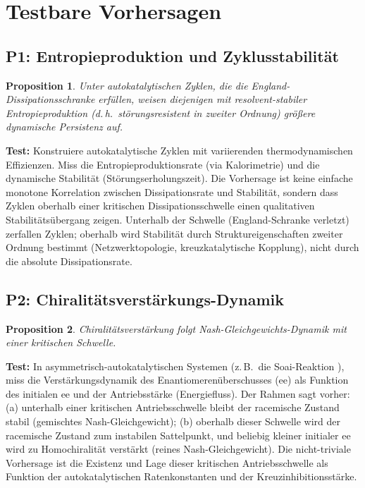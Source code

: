 \documentclass[12pt,a4paper]{article}
\newtheorem{proposition}{Proposition}
\theoremstyle{remark}
\begin{document}
\section{Testbare Vorhersagen}
\label{sec:predictions}

\subsection{P1: Entropieproduktion und Zyklusstabilit\"at}

\begin{proposition}
Unter autokatalytischen Zyklen, die die England-Dissipationsschranke erf\"ullen, weisen diejenigen mit resolvent-stabiler Entropieproduktion (d.\,h.\ st\"orungsresistent in zweiter Ordnung) gr\"o\ss{}ere dynamische Persistenz auf.
\end{proposition}

\textbf{Test:} Konstruiere autokatalytische Zyklen mit variierenden thermodynamischen Effizienzen. Miss die Entropieproduktionsrate (via Kalorimetrie) und die dynamische Stabilit\"at (St\"orungserholungszeit). Die Vorhersage ist keine einfache monotone Korrelation zwischen Dissipationsrate und Stabilit\"at, sondern dass Zyklen oberhalb einer kritischen Dissipationsschwelle einen qualitativen Stabilit\"ats\"ubergang zeigen. Unterhalb der Schwelle (England-Schranke verletzt) zerfallen Zyklen; oberhalb wird Stabilit\"at durch Struktureigenschaften zweiter Ordnung bestimmt (Netzwerktopologie, kreuzkatalytische Kopplung), nicht durch die absolute Dissipationsrate.

\subsection{P2: Chiralit\"atsverst\"arkungs-Dynamik}

\begin{proposition}
Chiralit\"atsverst\"arkung folgt Nash-Gleichgewichts-Dynamik mit einer kritischen Schwelle.
\end{proposition}

\textbf{Test:} In asymmetrisch-autokatalytischen Systemen (z.\,B.\ die Soai-Reaktion \citep{Soai1995}), miss die Verst\"arkungsdynamik des Enantiomeren\"uberschusses (ee) als Funktion des initialen ee und der Antriebsst\"arke (Energiefluss). Der Rahmen sagt vorher: (a) unterhalb einer kritischen Antriebsschwelle bleibt der racemische Zustand stabil (gemischtes Nash-Gleichgewicht); (b) oberhalb dieser Schwelle wird der racemische Zustand zum instabilen Sattelpunkt, und beliebig kleiner initialer ee wird zu Homochiralit\"at verst\"arkt (reines Nash-Gleichgewicht). Die nicht-triviale Vorhersage ist die Existenz und Lage dieser kritischen Antriebsschwelle als Funktion der autokatalytischen Ratenkonstanten und der Kreuzinhibitionsst\"arke.
\end{document}

